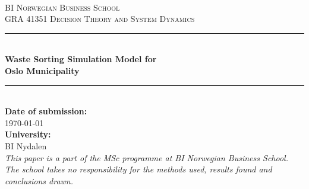 \begin{titlepage}

\newcommand{\HRule}{\color{rockwoolcolor}\rule{\linewidth}{0.75mm}\color{black}} %

\center %
 
\ \\[1.5cm]
\textsc{\LARGE BI Norwegian Business School}\\[1.5cm] %
\textsc{\Large GRA 41351 Decision Theory and System Dynamics}\\[2.5cm] %



\HRule \\[0.4cm]
{ \huge \bfseries Waste Sorting Simulation Model for \\[0.5cm] Oslo Municipality}\\[0.4cm] %
\HRule \\[2.5cm]
 

{\large \textbf{Date of submission:}\\  \today}\\[1cm] %
{\large \textbf{University:}\\  BI Nydalen}\\[3cm] %
 

\textit{This paper is a part of the MSc programme at BI Norwegian Business School. The school takes no
responsibility for the methods used, results found and conclusions drawn.}
\vfill %

\end{titlepage}